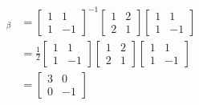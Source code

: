 \documentclass[answers,12pt,addpoints]{exam}
\begin{document}
\begin{questions}
\begin{solution}
        \begin{align*}        
            [L_A]_\beta &= \begin{bmatrix}
                1 & 1\\
                1 & -1 
            \end{bmatrix}^{-1} \begin{bmatrix}
                1 & 2\\
                2 & 1
            \end{bmatrix} \begin{bmatrix}
                1 & 1\\
                1 & -1
            \end{bmatrix}\\
            &= \frac{1}{2}\begin{bmatrix}
                1 & 1\\
                1 & -1
            \end{bmatrix} \begin{bmatrix}
                1 & 2\\
                2 & 1
            \end{bmatrix} \begin{bmatrix}
                1 & 1\\
                1 & -1
            \end{bmatrix}\\
            &= \begin{bmatrix}
                3 & 0\\
                0 & -1
            \end{bmatrix}
        \end{align*}
        

\end{solution}
\end{questions}
\end{document}
